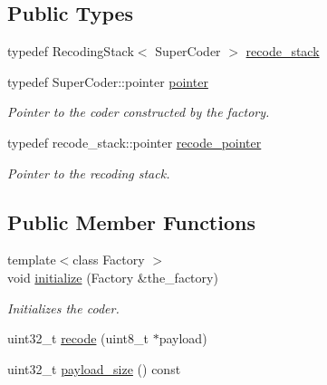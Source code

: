 \subsection*{Public Types}
\begin{DoxyCompactItemize}
\item 
typedef Recoding\-Stack$<$ Super\-Coder $>$ \hyperlink{classkodo_1_1payload__recoder_ae40f7011e88c0b6509efce4fe4182df6}{recode\-\_\-stack}
\item 
\hypertarget{classkodo_1_1payload__recoder_a94e44641e051e5a2904543e4cd45c541}{typedef Super\-Coder\-::pointer \hyperlink{classkodo_1_1payload__recoder_a94e44641e051e5a2904543e4cd45c541}{pointer}}\label{classkodo_1_1payload__recoder_a94e44641e051e5a2904543e4cd45c541}

\begin{DoxyCompactList}\small\item\em Pointer to the coder constructed by the factory. \end{DoxyCompactList}\item 
\hypertarget{classkodo_1_1payload__recoder_adf59d1601c93717e9f17b6baa2f73e31}{typedef recode\-\_\-stack\-::pointer \hyperlink{classkodo_1_1payload__recoder_adf59d1601c93717e9f17b6baa2f73e31}{recode\-\_\-pointer}}\label{classkodo_1_1payload__recoder_adf59d1601c93717e9f17b6baa2f73e31}

\begin{DoxyCompactList}\small\item\em Pointer to the recoding stack. \end{DoxyCompactList}\end{DoxyCompactItemize}
\subsection*{Public Member Functions}
\begin{DoxyCompactItemize}
\item 
{\footnotesize template$<$class Factory $>$ }\\void \hyperlink{classkodo_1_1payload__recoder_abc4e07b712377850e90b67eb7dba533f}{initialize} (Factory \&the\-\_\-factory)
\begin{DoxyCompactList}\small\item\em Initializes the coder. \end{DoxyCompactList}\item 
uint32\-\_\-t \hyperlink{classkodo_1_1payload__recoder_a859fae103d182ed8076f53d72976441b}{recode} (uint8\-\_\-t $\ast$payload)
\begin{DoxyCompactList}\small\item\em \end{DoxyCompactList}\item 
uint32\-\_\-t \hyperlink{classkodo_1_1payload__recoder_a09e6d9d43172e206c423ed682a385c74}{payload\-\_\-size} () const 
\begin{DoxyCompactList}\small\item\em \end{DoxyCompactList}\end{DoxyCompactItemize}
